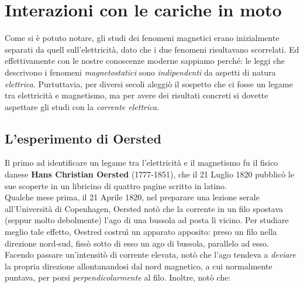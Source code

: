 \section{Interazioni con le cariche in moto}
Come si è potuto notare, gli studi dei fenomeni magnetici erano inizialmente separati da quell sull'elettricità, dato che i due fenomeni risultavano scorrelati. Ed effettivamente con le nostre conoscenze moderne sappiamo perché: le leggi che descrivono i fenomeni \textit{magnetostatici} sono \textit{indipendenti} da aspetti di natura \textit{elettrica}. Purtuttavia, per diversi secoli aleggiò il sospetto che ci fosse un legame tra elettricità e magnetismo, ma per avere dei risultati concreti si dovette aspettare gli studi con la \textit{corrente elettrica}.
\subsection{L'esperimento di Oersted}
Il primo ad identificare un legame tra l'elettricità e il magnetismo fu il fisico danese \textbf{Hans Christian Oersted} (1777-1851), che il 21 Luglio 1820 pubblicò le sue scoperte in un libricino di quattro pagine scritto in latino.\\
Qualche mese prima, il 21 Aprile 1820, nel preparare una lezione serale all'Università di Copenhagen, Oersted notò che la corrente in un filo spostava (seppur molto debolmente) l'ago di una bussola ad posta lì vicino.
Per studiare meglio tale effetto, Oestred costruì un apparato apposito: preso un filo nella direzione nord-sud, fissò sotto di esso un ago di bussola, parallelo ad esso. Facendo passare un'intensitò di corrente elevata, notò che l'ago tendeva a \textit{deviare} la propria direzione allontanandosi dal nord magnetico, a cui normalmente puntava, per porsi \textit{perpendicolarmente} al filo. Inoltre, notò che:\\
